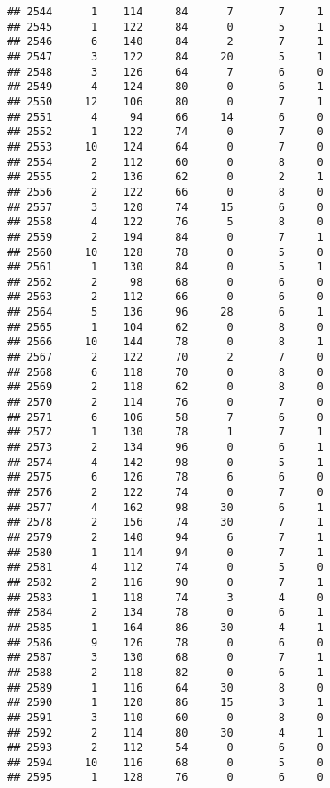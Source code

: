 \documentclass[
]{article}
\begin{document}
\begin{verbatim}
## 2544      1    114     84      7       7     1
## 2545      1    122     84      0       5     1
## 2546      6    140     84      2       7     1
## 2547      3    122     84     20       5     1
## 2548      3    126     64      7       6     0
## 2549      4    124     80      0       6     1
## 2550     12    106     80      0       7     1
## 2551      4     94     66     14       6     0
## 2552      1    122     74      0       7     0
## 2553     10    124     64      0       7     0
## 2554      2    112     60      0       8     0
## 2555      2    136     62      0       2     1
## 2556      2    122     66      0       8     0
## 2557      3    120     74     15       6     0
## 2558      4    122     76      5       8     0
## 2559      2    194     84      0       7     1
## 2560     10    128     78      0       5     0
## 2561      1    130     84      0       5     1
## 2562      2     98     68      0       6     0
## 2563      2    112     66      0       6     0
## 2564      5    136     96     28       6     1
## 2565      1    104     62      0       8     0
## 2566     10    144     78      0       8     1
## 2567      2    122     70      2       7     0
## 2568      6    118     70      0       8     0
## 2569      2    118     62      0       8     0
## 2570      2    114     76      0       7     0
## 2571      6    106     58      7       6     0
## 2572      1    130     78      1       7     1
## 2573      2    134     96      0       6     1
## 2574      4    142     98      0       5     1
## 2575      6    126     78      6       6     0
## 2576      2    122     74      0       7     0
## 2577      4    162     98     30       6     1
## 2578      2    156     74     30       7     1
## 2579      2    140     94      6       7     1
## 2580      1    114     94      0       7     1
## 2581      4    112     74      0       5     0
## 2582      2    116     90      0       7     1
## 2583      1    118     74      3       4     0
## 2584      2    134     78      0       6     1
## 2585      1    164     86     30       4     1
## 2586      9    126     78      0       6     0
## 2587      3    130     68      0       7     1
## 2588      2    118     82      0       6     1
## 2589      1    116     64     30       8     0
## 2590      1    120     86     15       3     1
## 2591      3    110     60      0       8     0
## 2592      2    114     80     30       4     1
## 2593      2    112     54      0       6     0
## 2594     10    116     68      0       5     0
## 2595      1    128     76      0       6     0

\end{verbatim}
\end{document}
